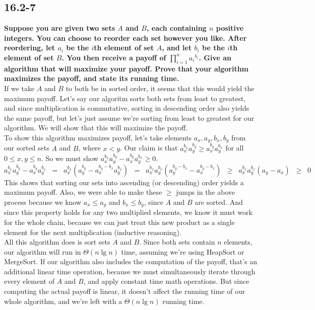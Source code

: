 \documentclass[11pt]{article}
\begin{document}
 \subsection*{16.2-7}
 \textbf{Suppose you are given two sets $A$ and $B$, each containing $n$ positive integers. You 
 can choose to reorder each set however you like. After reordering, let $a_i$ be the $i$th 
 element of set $A$, and let $b_i$ be the $i$th element of set $B$. You then receive a payoff 
 of $\prod_{i=1}^n {a_i}^{b_i}$. Give an algorithm that will maximize your payoff. Prove that 
 your algorithm maximizes the payoff, and state its running time.} \\
 
 If we take $A$ and $B$ to both be in sorted order, it seems that this would yield the maximum 
 payoff.  Let's say our algoritm sorts both sets from least to greatest, and since 
 multiplication is commutative, sorting in descending order also yields the same payoff, but 
 let's just assume we're sorting from least to greatest for our algorithm.  We will show that 
 this will maximize the payoff. \\

 To show this algorithm maximizes payoff, let's take elements $a_x,a_y,b_x,b_y$ from our sorted 
 sets $A$ and $B$, where $x < y$. Our claim is that $a_x^{b_x}a_y^{b_y} \geq a_x^{b_y}a_y^{b_x}$ 
 for all $0 \leq x,y \leq n$.  So we must show $a_x^{b_x}a_y^{b_y} - a_x^{b_y}a_y^{b_x} \geq 0$.
 $$a_x^{b_x}a_y^{b_y} - a_x^{b_y}a_y^{b_x} \;\;=\;\; a_x^{b_x}(a_y^{b_y} - a_x^{b_y-b_x}a_y^{b_x})
 \;\;=\;\; a_x^{b_x}a_y^{b_x}(a_y^{b_y-b_x} - a_x^{b_y-b_x}) \;\;\geq\;\; a_x^{b_x}a_y^{b_x}(a_y - a_x) 
 \;\;\geq\;\; 0$$
 This shows that sorting our sets into ascending (or descending) order yields a maximum payoff.
 Also, we were able to make these $\geq$ jumps in the above process because we know $a_x \leq a_y$ 
 and $b_x \leq b_y$, since $A$ and $B$ are sorted. And since this property holds for any two 
 multiplied elements, we know it must work for the whole chain, because we can just treat this 
 new product as a single element for the next multiplication (inductive reasoning). \\


 All this algorithm does is sort sets $A$ and $B$.  Since both sets contain $n$ elements, our 
 algorithm will run in $\Theta(n \lg n)$ time, assuming we're using HeapSort or MergeSort.  If 
 our algorithm also includes the computation of the payoff, that's an additional linear time 
 operation, because we must simultaneously iterate through every element of $A$ and $B$, and 
 apply constant time math operations.  But since computing the actual payoff is linear, it 
 doesn't affect the running time of our whole algorithm, and we're left with a $\Theta(n\lg n)$ 
 running time.

 \newpage
\end{document}
